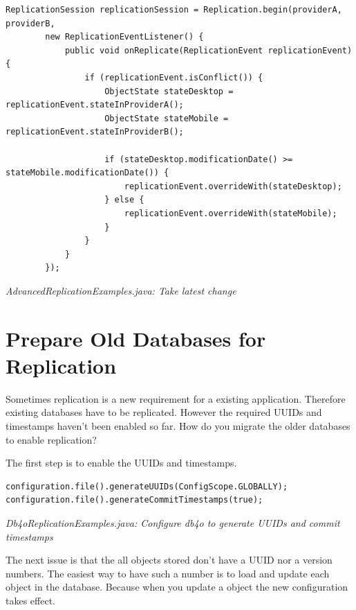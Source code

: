 \begin{lstlisting}
ReplicationSession replicationSession = Replication.begin(providerA, providerB,
        new ReplicationEventListener() {
            public void onReplicate(ReplicationEvent replicationEvent) {
                if (replicationEvent.isConflict()) {
                    ObjectState stateDesktop = replicationEvent.stateInProviderA();
                    ObjectState stateMobile = replicationEvent.stateInProviderB();

                    if (stateDesktop.modificationDate() >= stateMobile.modificationDate()) {
                        replicationEvent.overrideWith(stateDesktop);
                    } else {
                        replicationEvent.overrideWith(stateMobile);
                    }
                }
            }
        });
\end{lstlisting}

{\small\itshape AdvancedReplicationExamples.java: Take latest change\par}
\medskip

\section{Prepare Old Databases for Replication}
\label{drs:db4o-replication-system-drs-advanced-replication-strategies-prepare-old-databases-for-replication}

Sometimes replication is a new requirement for a existing application. Therefore existing databases have to be replicated. However the required UUIDs and timestamps haven't been enabled so far. How do you migrate the older databases to enable replication?

The first step is to enable the UUIDs and timestamps.

\begin{lstlisting}
configuration.file().generateUUIDs(ConfigScope.GLOBALLY);
configuration.file().generateCommitTimestamps(true);
\end{lstlisting}

{\small\itshape Db4oReplicationExamples.java: Configure db4o to generate UUIDs and commit timestamps\par}
\medskip

The next issue is that the all objects stored don't have a UUID nor a version numbers. The easiest way to have such a number is to load and update each object in the database. Because when you update a object the new configuration takes effect.


